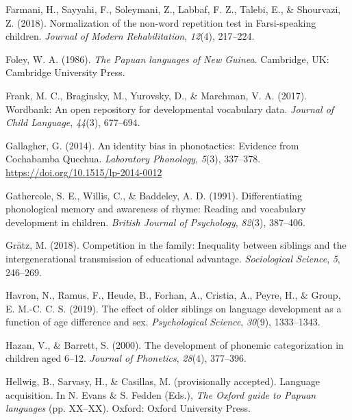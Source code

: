 \documentclass[
  american,
  ,man,floatsintext]{apa6}
\newlength{\cslhangindent}
\newlength{\cslentryspacingunit} %
\newenvironment{CSLReferences}[2] %
 {%
  \setlength{\parindent}{0pt}
  \ifodd #1
  \let\oldpar\par
  \def\par{\hangindent=\cslhangindent\oldpar}
  \fi
  \setlength{\parskip}{#2\cslentryspacingunit}
 }%
 {}
\begin{document}
\begin{CSLReferences}{1}{0}
\leavevmode{}%
Farmani, H., Sayyahi, F., Soleymani, Z., Labbaf, F. Z., Talebi, E., \& Shourvazi, Z. (2018). Normalization of the non-word repetition test in {F}arsi-speaking children. \emph{Journal of Modern Rehabilitation}, \emph{12}(4), 217--224.

\leavevmode{}%
Foley, W. A. (1986). \emph{{The Papuan languages of New Guinea}}. Cambridge, UK: Cambridge University Press.

\leavevmode{}%
Frank, M. C., Braginsky, M., Yurovsky, D., \& Marchman, V. A. (2017). Wordbank: An open repository for developmental vocabulary data. \emph{Journal of Child Language}, \emph{44}(3), 677--694.

\leavevmode{}%
Gallagher, G. (2014). {An identity bias in phonotactics: Evidence from Cochabamba Quechua}. \emph{Laboratory Phonology}, \emph{5}(3), 337--378. \url{https://doi.org/10.1515/lp-2014-0012}

\leavevmode{}%
Gathercole, S. E., Willis, C., \& Baddeley, A. D. (1991). Differentiating phonological memory and awareness of rhyme: Reading and vocabulary development in children. \emph{British Journal of Psychology}, \emph{82}(3), 387--406.

\leavevmode{}%
Grätz, M. (2018). Competition in the family: Inequality between siblings and the intergenerational transmission of educational advantage. \emph{Sociological Science}, \emph{5}, 246--269.

\leavevmode{}%
Havron, N., Ramus, F., Heude, B., Forhan, A., Cristia, A., Peyre, H., \& Group, E. M.-C. C. S. (2019). The effect of older siblings on language development as a function of age difference and sex. \emph{Psychological Science}, \emph{30}(9), 1333--1343.

\leavevmode{}%
Hazan, V., \& Barrett, S. (2000). The development of phonemic categorization in children aged 6--12. \emph{Journal of Phonetics}, \emph{28}(4), 377--396.

\leavevmode{}%
Hellwig, B., Sarvasy, H., \& Casillas, M. (provisionally accepted). Language acquisition. In N. Evans \& S. Fedden (Eds.), \emph{The {O}xford guide to {P}apuan languages} (pp. XX--XX). Oxford: Oxford University Press.


\end{CSLReferences}
\end{document}
